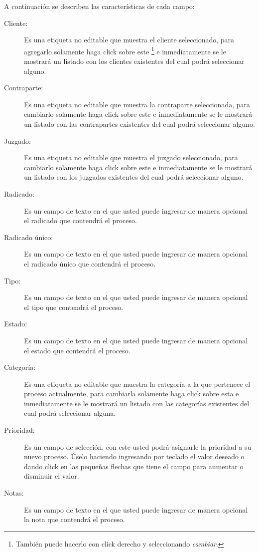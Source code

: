  A continuaci\'on se describen las
caracter\'isticas de cada campo:
\begin{description}
\item[Cliente:]Es una etiqueta no editable que muestra el cliente
seleccionado, para agregarlo solamente haga click sobre este
\footnote{Tambi\'en puede hacerlo con click derecho y seleccionando \emph{cambiar}.}
e inmediatamente se
le mostrar\'a un listado con los clientes existentes del cual podr\'a
seleccionar alguno.
\item[Contraparte:]Es una etiqueta no editable que muestra la contraparte
seleccionada, para cambiarlo solamente haga click sobre este
\footnotemark[\value{footnote}]
e inmediatamente
se le mostrar\'a un listado con las contrapartes existentes del cual podr\'a
seleccionar alguno.
\item[Juzgado:]Es una etiqueta no editable que muestra el juzgado
seleccionado, para cambiarlo solamente haga click sobre este
\footnotemark[\value{footnote}]
e inmediatamente
se le mostrar\'a un listado con los juzgados existentes del cual podr\'a
seleccionar alguno.
\item[Radicado:]Es un campo de texto en el que usted puede ingresar de manera
opcional el radicado que contendr\'a el proceso.
\item[Radicado \'unico:]Es un campo de texto en el que usted puede ingresar de
manera opcional el radicado \'unico que contendr\'a el proceso.
\item[Tipo:]Es un campo de texto en el que usted puede ingresar de manera
opcional el tipo que contendr\'a el proceso.
\item[Estado:]Es un campo de texto en el que usted puede ingresar de manera
opcional el estado que contendr\'a el proceso.
\item[Categor\'ia:]Es una etiqueta no editable que muestra la categor\'ia
a la que pertenece el proceso actualmente, para cambiarla solamente haga click
sobre esta
\footnotemark[\value{footnote}]
e inmediatamente
se le mostrar\'a un listado con las categor\'ias existentes del cual podr\'a
seleccionar alguna.
\item[Prioridad:]Es un campo de selecci\'on, con este usted podr\'a asignarle
la prioridad a su nuevo proceso. \'Uselo haciendo ingresando por teclado el valor deseado o dando click en las peque\~nas flechas que tiene el campo para aumentar o disminuir el valor.
\item[Notas:]Es un campo de texto en el que usted puede ingresar de manera
opcional la nota que contendr\'a el proceso.
\end{description}

